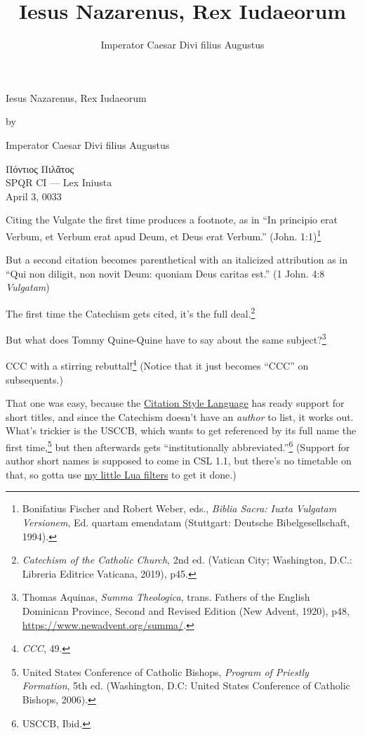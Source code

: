 \documentclass[
    12pt,
    letterpaper,
    oneside,
    noraggedright
]{turabian-researchpaper}
\title{Iesus Nazarenus, Rex Iudaeorum}
\author{Imperator Caesar Divi filius Augustus}
\begin{document}
    \begin{center}

    \thispagestyle{empty}
    \vspace*{1in}
    \begin{singlespace}
        Iesus Nazarenus, Rex Iudaeorum
        \end{singlespace}
    \vspace{2in - \baselineskip}

    by
    \vspace{2in - \baselineskip}

    Imperator Caesar Divi filius Augustus

    \vspace{2in - \baselineskip}

    \begin{singlespace}
        Πόντιος Πιλᾶτος \\
        SPQR CI --- Lex Iniusta \\
        April 3, 0033
    \end{singlespace}
    \end{center}
    \newpage
    \setcounter{page}{1}

Citing the Vulgate the first time produces a footnote, as in ``In
principio erat Verbum, et Verbum erat apud Deum, et Deus erat Verbum.''
(John. 1:1)\footnote{Bonifatius Fischer and Robert Weber, eds.,
  \emph{Biblia Sacra: Iuxta Vulgatam Versionem}, Ed. quartam emendatam
  (Stuttgart: Deutsche Bibelgesellschaft, 1994).}

But a second citation becomes parenthetical with an italicized
attribution as in ``Qui non diligit, non novit Deum: quoniam Deus
caritas est.'' (1 John. 4:8{ \emph{Vulgatam}})

The first time the Catechism gets cited, it's the full deal.\footnote{\emph{Catechism
  of the Catholic Church}, 2nd ed. (Vatican City; Washington, D.C.:
  Libreria Editrice Vaticana, 2019), p45.}

But what does Tommy Quine-Quine have to say about the same
subject?\footnote{Thomas Aquinas, \emph{Summa Theologica}, trans.
  Fathers of the English Dominican Province, Second and Revised Edition
  (New Advent, 1920), p48, \url{https://www.newadvent.org/summa/}.}

CCC with a stirring rebuttal!\footnote{\emph{CCC}, 49.} (Notice that it
just becomes ``CCC'' on subsequents.)

That one was easy, because the
\href{https://citationstyles.org/}{Citation Style Language} has ready
support for short titles, and since the Catechism doesn't have an
\emph{author} to list, it works out. What's trickier is the USCCB, which
wants to get referenced by its full name the first time,\footnote{United
  States Conference of Catholic Bishops, \emph{Program of Priestly
  Formation}, 5th ed. (Washington, D.C: United States Conference of
  Catholic Bishops, 2006).} but then afterwards gets ``institutionally
abbreviated.''\footnote{USCCB, Ibid.} (Support for author short names is
supposed to come in CSL 1.1, but there's no timetable on that, so gotta
use
\href{https://github.com/sjml/paper/tree/main/paper/resources/project_template/.paper_resources/filters}{my
little Lua filters} to get it done.)
\end{document}

